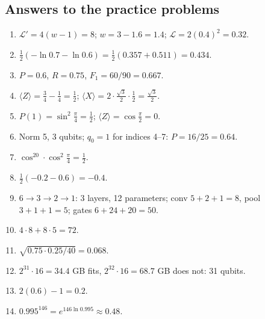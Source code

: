 \documentclass[11pt,a4paper,openany]{book}
\begin{document}
\subsection*{Answers to the practice problems}
\begin{enumerate}[label=\textbf{P\arabic*.}, leftmargin=2.6em, itemsep=3pt]
\item $\mathcal L' = 4(w - 1) = 8$; $w = 3 - 1.6 = 1.4$; $\mathcal L = 2(0.4)^2 = 0.32$.
\item $\frac12(-\ln0.7 - \ln0.6) = \frac12(0.357 + 0.511) = 0.434$.
\item $P = 0.6$, $R = 0.75$, $F_1 = 60/90 = 0.667$.
\item $\langle Z\rangle = \frac34 - \frac14 = \frac12$; $\langle X\rangle = 2\cdot\frac{\sqrt3}2\cdot\frac12 = \frac{\sqrt3}2$.
\item $P(1) = \sin^2\frac\pi4 = \frac12$; $\langle Z\rangle = \cos\frac\pi2 = 0$.
\item Norm 5, 3 qubits; $q_0 = 1$ for indices 4--7: $P = 16/25 = 0.64$.
\item $\cos^20\cdot\cos^2\frac\pi4 = \frac12$.
\item $\frac12(-0.2 - 0.6) = -0.4$.
\item $6 \to 3 \to 2 \to 1$: 3 layers, 12 parameters; conv $5 + 2 + 1 = 8$, pool $3 + 1 + 1 = 5$; gates $6 + 24 + 20 = 50$.
\item $4\cdot8 + 8\cdot5 = 72$.
\item $\sqrt{0.75\cdot0.25/40} = 0.068$.
\item $2^{31}\cdot16 = 34.4$ GB fits, $2^{32}\cdot16 = 68.7$ GB does not: 31 qubits.
\item $2(0.6) - 1 = 0.2$.
\item $0.995^{146} = e^{146\ln0.995} \approx 0.48$.
\end{enumerate}
\end{document}
